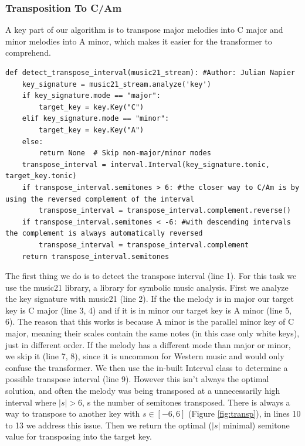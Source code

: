 \documentclass[a4paper,12pt]{extarticle}
\begin{document}
\subsubsection{Transposition To C/Am}
A key part of our algorithm is to transpose major melodies into C major and minor melodies into A minor, which makes it easier for the transformer to comprehend. \newline
\begin{lstlisting}
def detect_transpose_interval(music21_stream): #Author: Julian Napier
    key_signature = music21_stream.analyze('key')
    if key_signature.mode == "major":
        target_key = key.Key("C")
    elif key_signature.mode == "minor":
        target_key = key.Key("A")
    else:
        return None  # Skip non-major/minor modes
    transpose_interval = interval.Interval(key_signature.tonic, target_key.tonic)
    if transpose_interval.semitones > 6: #the closer way to C/Am is by using the reversed complement of the interval
        transpose_interval = transpose_interval.complement.reverse()
    if transpose_interval.semitones < -6: #with descending intervals the complement is always automatically reversed
        transpose_interval = transpose_interval.complement
    return transpose_interval.semitones
\end{lstlisting}
The first thing we do is to detect the transpose interval (line 1). For this task we use the music21 library, a library for symbolic music analysis. First we analyze the key signature with music21 (line 2). If the the melody is in major our target key is C major (line 3, 4) and if it is in minor our target key is A minor (line 5, 6). The reason that this works is because A minor is the parallel minor key of C major, meaning their scales contain the same notes (in this case only white keys), just in different order. If the melody has a different mode than major or minor, we skip it (line 7, 8), since it is uncommon for Western music and would only confuse the transformer. We then use the in-built Interval class to determine a possible transpose interval (line 9). However this isn't always the optimal solution, and often the melody was being transposed at a unnecessarily high interval where $|s| > 6$, s the number of semitones transposed. There is always a way to transpose to another key with $s \in [-6, 6]$ (Figure \ref{fig:transp}), in lines 10 to 13 we address this issue. Then we return the optimal ($|s|$ minimal) semitone value for transposing into the target key. \newline
\end{document}

